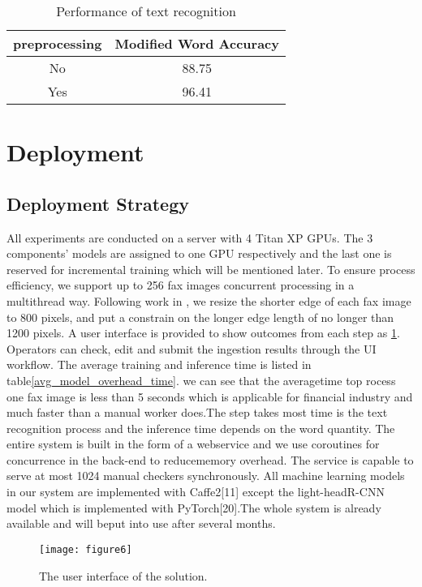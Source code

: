 \documentclass[sigconf]{acmart}
\begin{document}
\begin{table}
	\caption{Performance of text recognition}
	\label{text_recognition}
	\centering
	\begin{tabular}{cc}
	\toprule
	\textbf{preprocessing} & \textbf{Modified Word Accuracy} \\
	\midrule
	No & 88.75 \\
	Yes & 96.41 \\
	\bottomrule
	\end{tabular}
\end{table}


\section{Deployment}
\subsection{Deployment Strategy}

All experiments are conducted on a server with 4 Titan XP GPUs. The 3 components' models are assigned to one GPU respectively and the last one is reserved for incremental training which will be mentioned later. To ensure process efficiency, we support up to 256 fax images concurrent processing in a multithread way. Following work in \cite{li2017light}, we resize the shorter edge of each fax image to 800 pixels, and put a constrain on the longer edge length of no longer than 1200 pixels. A user interface is provided to show outcomes from each step as \ref{figure6}. Operators can check, edit and submit the ingestion results through the UI workflow. The average training and inference time is listed in table\ref{avg_model_overhead_time}. we can see that the averagetime top rocess one fax image is less than 5 seconds which is applicable for financial industry and much faster than a manual worker does.The step takes most time is the text recognition process and the inference time depends on the word quantity. The entire system is built in the form of a webservice and we use coroutines for concurrence in  the back-end to reducememory overhead. The service is capable to serve at most 1024 manual checkers synchronously. All machine learning models in our system are implemented with Caffe2[11] except the light-headR-CNN model which is implemented with PyTorch[20].The whole system is already available and will beput into use after several months. 


\begin{figure}[h]
	\centering
	\texttt{[image: figure6]}
	\caption{The user interface of the solution.}
	\label{figure6}
\end{figure}
\end{document}
